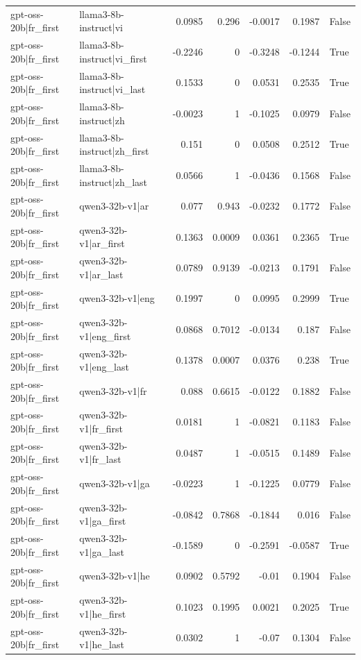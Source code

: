 \begin{table}
\begin{tabular}{l l r r r r l}
gpt-oss-20b|fr_first & llama3-8b-instruct|vi & 0.0985 & 0.296 & -0.0017 & 0.1987 & False \\
gpt-oss-20b|fr_first & llama3-8b-instruct|vi_first & -0.2246 & 0 & -0.3248 & -0.1244 & True \\
gpt-oss-20b|fr_first & llama3-8b-instruct|vi_last & 0.1533 & 0 & 0.0531 & 0.2535 & True \\
gpt-oss-20b|fr_first & llama3-8b-instruct|zh & -0.0023 & 1 & -0.1025 & 0.0979 & False \\
gpt-oss-20b|fr_first & llama3-8b-instruct|zh_first & 0.151 & 0 & 0.0508 & 0.2512 & True \\
gpt-oss-20b|fr_first & llama3-8b-instruct|zh_last & 0.0566 & 1 & -0.0436 & 0.1568 & False \\
gpt-oss-20b|fr_first & qwen3-32b-v1|ar & 0.077 & 0.943 & -0.0232 & 0.1772 & False \\
gpt-oss-20b|fr_first & qwen3-32b-v1|ar_first & 0.1363 & 0.0009 & 0.0361 & 0.2365 & True \\
gpt-oss-20b|fr_first & qwen3-32b-v1|ar_last & 0.0789 & 0.9139 & -0.0213 & 0.1791 & False \\
gpt-oss-20b|fr_first & qwen3-32b-v1|eng & 0.1997 & 0 & 0.0995 & 0.2999 & True \\
gpt-oss-20b|fr_first & qwen3-32b-v1|eng_first & 0.0868 & 0.7012 & -0.0134 & 0.187 & False \\
gpt-oss-20b|fr_first & qwen3-32b-v1|eng_last & 0.1378 & 0.0007 & 0.0376 & 0.238 & True \\
gpt-oss-20b|fr_first & qwen3-32b-v1|fr & 0.088 & 0.6615 & -0.0122 & 0.1882 & False \\
gpt-oss-20b|fr_first & qwen3-32b-v1|fr_first & 0.0181 & 1 & -0.0821 & 0.1183 & False \\
gpt-oss-20b|fr_first & qwen3-32b-v1|fr_last & 0.0487 & 1 & -0.0515 & 0.1489 & False \\
gpt-oss-20b|fr_first & qwen3-32b-v1|ga & -0.0223 & 1 & -0.1225 & 0.0779 & False \\
gpt-oss-20b|fr_first & qwen3-32b-v1|ga_first & -0.0842 & 0.7868 & -0.1844 & 0.016 & False \\
gpt-oss-20b|fr_first & qwen3-32b-v1|ga_last & -0.1589 & 0 & -0.2591 & -0.0587 & True \\
gpt-oss-20b|fr_first & qwen3-32b-v1|he & 0.0902 & 0.5792 & -0.01 & 0.1904 & False \\
gpt-oss-20b|fr_first & qwen3-32b-v1|he_first & 0.1023 & 0.1995 & 0.0021 & 0.2025 & True \\
gpt-oss-20b|fr_first & qwen3-32b-v1|he_last & 0.0302 & 1 & -0.07 & 0.1304 & False \\

\end{tabular}
\end{table}
